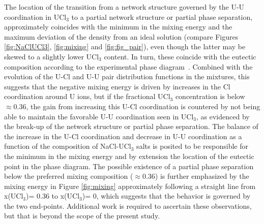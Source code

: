 \documentclass[preprint,3p,10pt,onecolumn,number,sort&compress]{elsarticle}
\begin{document}
{The location of the transition from a network structure governed by the U-U coordination in UCl$_3$ to a partial network structure or partial phase separation, approximately coincides with the minimum in the mixing energy and the maximum deviation of the density from an ideal solution (compare Figures \ref{fig:NaClUCl3}, \ref{fig:mixing} and \ref{fig:fig_pair}), even though the latter may be skewed to a slightly lower UCl$_3$ content. In turn, these coincide with the eutectic composition according to the experimental phase diagram~\cite{YIN2020}. Combined with the evolution of the U-Cl and U-U pair distribution functions in the mixtures, this suggests that the negative mixing energy is driven by increases in the Cl coordination around U ions, but if the fractional UCl$_3$ concentration is below $\approx0.36$, the gain from increasing this U-Cl coordination is countered by not being able to maintain the favorable U-U coordination seen in UCl$_3$, as evidenced by the break-up of the network structure or partial phase separation. The balance of the increase in the U-Cl coordination and decrease in U-U coordination as a function of the composition of NaCl-UCl$_3$ salts is posited to be responsible for the minimum in the mixing energy and by extension the location of the eutectic point in the phase diagram. The possible existence of a partial phase separation below the preferred mixing composition ($\approx 0.36$) is further emphasized by the mixing energy in Figure \ref{fig:mixing} approximately following a straight line from x(UCl$_3$)= 0.36 to x(UCl$_3$)= 0, which suggests that the behavior is governed by the two end-points. Additional work is required to ascertain these observations, but that is beyond the scope of the present study.

}
\end{document}
